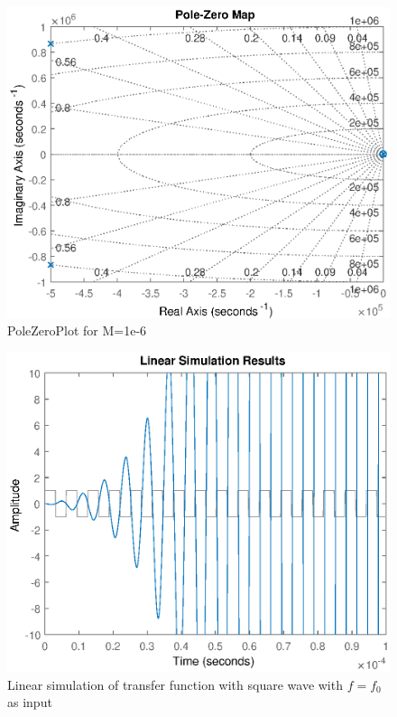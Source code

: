 \begin{figure}
    \centering
    \includegraphics[width=\textwidth]{img/PoleZeroPlot.eps}
    \caption{PoleZeroPlot for M=1e-6}
    \label{fig:my_label}
\end{figure}


\begin{figure}
    \centering
    \includegraphics[width=\textwidth]{img/Simulation.eps}
    \caption{Linear simulation of transfer function with square wave with $f=f_0$ as input}
    \label{fig:my_label}
\end{figure}


